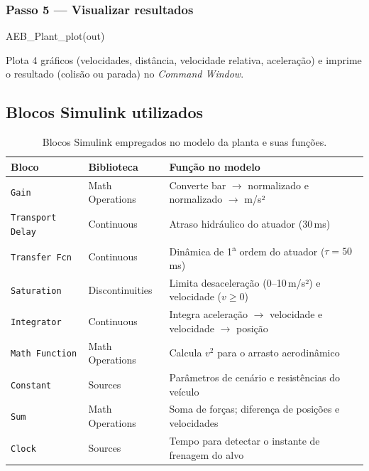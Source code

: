 \documentclass[12pt,a4paper]{article}
\begin{document}
\subsubsection*{Passo 5 --- Visualizar resultados}
\begin{codigobox}
AEB\_Plant\_plot(out)
\end{codigobox}
Plota 4 gráficos (velocidades, distância, velocidade relativa, aceleração) e
imprime o resultado (colisão ou parada) no \emph{Command Window}.

\subsection{Blocos Simulink utilizados}

\begin{table}[H]
  \centering
  \caption{Blocos Simulink empregados no modelo da planta e suas funções.}
  \begin{tabularx}{\linewidth}{llX}
    \toprule
    \rowcolor{azulescuro!90}
    \color{white}\textbf{Bloco} &
    \color{white}\textbf{Biblioteca} &
    \color{white}\textbf{Função no modelo} \\
    \midrule
    \texttt{Gain}              & Math Operations  & Converte bar $\to$ normalizado e normalizado $\to$ m/s² \\
    \rowcolor{azulclaro!50}
    \texttt{Transport Delay}   & Continuous       & Atraso hidráulico do atuador (30\,ms) \\
    \texttt{Transfer Fcn}      & Continuous       & Dinâmica de 1\textsuperscript{a} ordem do atuador ($\tau = 50$\,ms) \\
    \rowcolor{azulclaro!50}
    \texttt{Saturation}        & Discontinuities  & Limita desaceleração (0--10\,m/s²) e velocidade ($v \geq 0$) \\
    \texttt{Integrator}        & Continuous       & Integra aceleração $\to$ velocidade e velocidade $\to$ posição \\
    \rowcolor{azulclaro!50}
    \texttt{Math Function}     & Math Operations  & Calcula $v^2$ para o arrasto aerodinâmico \\
    \texttt{Constant}          & Sources          & Parâmetros de cenário e resistências do veículo \\
    \rowcolor{azulclaro!50}
    \texttt{Sum}               & Math Operations  & Soma de forças; diferença de posições e velocidades \\
    \texttt{Clock}             & Sources          & Tempo para detectar o instante de frenagem do alvo \\

\end{tabularx}
\end{table}
\end{document}

